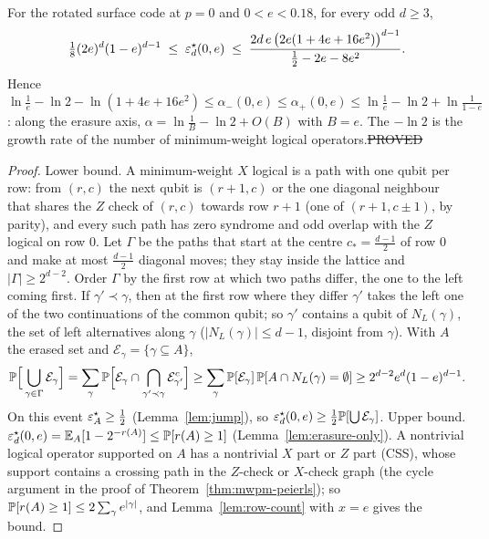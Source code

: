 \begin{theorem}\label{thm:erasure-exponent}
For the rotated surface code at $p=0$ and $0<e<0.18$, for every odd $d\ge3$,
\[
\tfrac18(2e)^d(1-e)^{d-1}\;\le\;\varepsilon^{\star}_d(0,e)\;\le\;\frac{2d\,e\,\big(2e(1+4e+16e^2)\big)^{d-1}}{\tfrac12-2e-8e^2}.
\]
Hence $\ln\frac1e-\ln2-\ln(1+4e+16e^2)\le\alpha_-(0,e)\le\alpha_+(0,e)\le\ln\frac1e-\ln2+\ln\frac1{1-e}$: along the erasure axis, $\alpha=\ln\frac1B-\ln2+O(B)$ with $B=e$. The $-\ln2$ is the growth rate of the number of minimum-weight logical operators.\hfill\st{PROVED}
\end{theorem}
\begin{proof}
Lower bound. A minimum-weight $X$ logical is a path with one qubit per row: from $(r,c)$ the next qubit is $(r+1,c)$ or the one diagonal neighbour that shares the $Z$ check of $(r,c)$ towards row $r+1$ (one of $(r+1,c\pm1)$, by parity), and every such path has zero syndrome and odd overlap with the $Z$ logical on row $0$. Let $\Gamma$ be the paths that start at the centre $c_\ast=\frac{d-1}2$ of row $0$ and make at most $\frac{d-1}2$ diagonal moves; they stay inside the lattice and $|\Gamma|\ge2^{d-2}$. Order $\Gamma$ by the first row at which two paths differ, the one to the left coming first. If $\gamma'\prec\gamma$, then at the first row where they differ $\gamma'$ takes the left one of the two continuations of the common qubit; so $\gamma'$ contains a qubit of $N_L(\gamma)$, the set of left alternatives along $\gamma$ ($|N_L(\gamma)|\le d-1$, disjoint from $\gamma$). With $A$ the erased set and $\mathcal E_\gamma=\{\gamma\subseteq A\}$,
\[
\mathbb{P}\Big[\bigcup_{\gamma\in\Gamma}\mathcal E_\gamma\Big]=\sum_{\gamma}\mathbb{P}\Big[\mathcal E_\gamma\cap\bigcap_{\gamma'\prec\gamma}\mathcal E^c_{\gamma'}\Big]\ge\sum_\gamma\mathbb{P}[\mathcal E_\gamma]\,\mathbb{P}[A\cap N_L(\gamma)=\emptyset]\ge2^{d-2}e^d(1-e)^{d-1}.
\]
On this event $\varepsilon^{\star}_A\ge\tfrac12$ (Lemma~\ref{lem:jump}), so $\varepsilon^{\star}_d(0,e)\ge\tfrac12\mathbb{P}[\bigcup\mathcal E_\gamma]$.
Upper bound. $\varepsilon^{\star}_d(0,e)=\mathbb{E}_A[1-2^{-r(A)}]\le\mathbb{P}[r(A)\ge1]$ (Lemma~\ref{lem:erasure-only}). A nontrivial logical operator supported on $A$ has a nontrivial $X$ part or $Z$ part (CSS), whose support contains a crossing path in the $Z$-check or $X$-check graph (the cycle argument in the proof of Theorem~\ref{thm:mwpm-peierls}); so $\mathbb{P}[r(A)\ge1]\le2\sum_\gamma e^{|\gamma|}$, and Lemma~\ref{lem:row-count} with $x=e$ gives the bound.
\end{proof}

